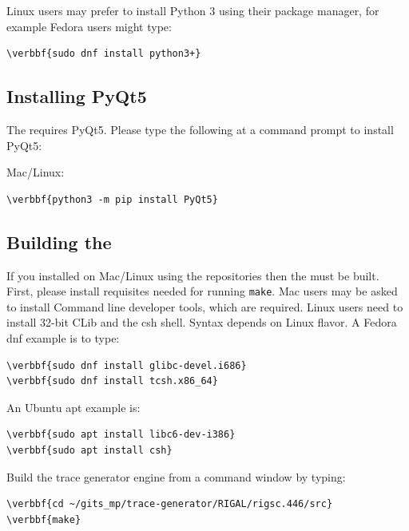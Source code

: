 \documentclass[11pt,fleqn]{article} %
\begin{document}
Linux users may prefer to install Python 3 using their package manager, for example Fedora users might type:
\begin{Verbatim}[commandchars=\\\{\}]
\verbbf{sudo dnf install python3+}
\end{Verbatim}

\subsection{Installing PyQt5}
The \ggui requires PyQt5.
Please type the following at a command prompt to install PyQt5:
\begin{compactitem}
\item Mac/Linux:
\begin{Verbatim}[commandchars=\\\{\}]
\verbbf{python3 -m pip install PyQt5}
\end{Verbatim}
\end{compactitem}

\subsection{Building the \gtg}
If you installed on Mac/Linux using the repositories then the \gtg must be built.
First, please install requisites needed for running \verb+make+.
Mac users may be asked to install Command line developer tools, which are required.  Linux users need to install 32-bit CLib and the csh shell. Syntax depends on Linux flavor.  A Fedora dnf example is to type:
\begin{Verbatim}[commandchars=\\\{\}]
\verbbf{sudo dnf install glibc-devel.i686}
\verbbf{sudo dnf install tcsh.x86_64}
\end{Verbatim}

An Ubuntu apt example is:
\begin{Verbatim}[commandchars=\\\{\}]
\verbbf{sudo apt install libc6-dev-i386}
\verbbf{sudo apt install csh}
\end{Verbatim}

Build the trace generator engine from a command window by typing:
\begin{Verbatim}[commandchars=\\\{\}]
\verbbf{cd ~/gits_mp/trace-generator/RIGAL/rigsc.446/src}
\verbbf{make}
\end{Verbatim}
\end{document}

